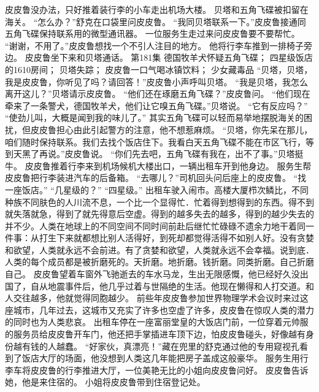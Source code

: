\documentclass[a4paper,12pt,UTF8,twoside]{ctexbook}
\begin{document}
        皮皮鲁没办法，只好推着装行李的小车走出机场大楼。 
        贝塔和五角飞碟被扣留在海关。 
        “怎么办？”舒克在口袋里问皮皮鲁。 
        “我同贝塔联系一下。”皮皮鲁接通同五角飞碟保持联系用的微型通讯器。 
        一位服务生走过来问皮皮鲁要不要帮忙。 
        “谢谢，不用了。”皮皮鲁想找一个不引人注目的地方。 
        他将行李车推到一排椅子旁边。 
        皮皮鲁坐下来和贝塔通话。   第181集 
        德国牧羊犬怀疑五角飞碟； 
        四星级饭店的1610房间； 
        贝塔失踪； 
        皮皮鲁一口气喝冰镇饮料； 
        少女藏毒品   
        “贝塔，贝塔，我是皮皮鲁，你听见了吗？请回答！”皮皮鲁小声呼叫贝塔。 
        “我是贝塔，我怎么离开这儿？”贝塔请示皮皮鲁。 
        “他们还在琢磨五角飞碟？”皮皮鲁问。 
        “他们现在牵来了一条警犬，德国牧羊犬，他们让它嗅五角飞碟。”贝塔说。 
        “它有反应吗？” 
        “使劲儿叫，大概是闻到我的味儿了。” 
        其实五角飞碟可以轻而易举地摆脱海关的困扰，但皮皮鲁担心由此引起警方的注意，他不想惹麻烦。 
        “贝塔，你先呆在那儿，咱们随时保持联系。我们去找个饭店住下。我看白天五角飞碟不能在市区飞行，等到天黑了再说。”皮皮鲁说。 
        “你们先去吧，五角飞碟有我在，出不了事。”贝塔挺牛。 
        皮皮鲁推着行李来到机场候机大楼出口，一辆出租车开到他身边。 
        服务生帮皮皮鲁把行李装进汽车的后备箱。 
        “去哪儿？”司机回头问后座上的皮皮鲁。 
        “找一座饭店。” 
        “几星级的？” 
        “四星级。” 
        出租车驶入闹市。高楼大厦栉次鳞比，不同种族不同肤色的人川流不息，一个比一个显得忙．忙着得到想得到的东西。得不到就失落就急，得到了就先得意后空虚。得到的越多失去的越多，得到的越少失去的并不少。人类在地球上的不同空间不同时间前赴后继忙忙碌碌不遗余力地干着同一件事：从打生下来就都想比别人活得好，到死却都觉得活得不如别人好。没有贪婪和欲望，人类就永远不会前进。有了贪婪和欲望，人类就永远不会幸福。说到底．人类的每个成员都是被折磨死的。天折磨。地折磨。钱折磨。同类折磨。自己折磨自己。 
        皮皮鲁望着车窗外飞驰逝去的车水马龙，生出无限感慨，他已经好久没出国了，自从地震事件后，他几乎过着与世隔绝的生活。他现在懒得和人打交道。和人交往越多，他就觉得同胞越少。 
        前些年皮皮鲁参加世界物理学术会议时来过这座城市，几年过去，这城市又充实了许多也空虚了许多，皮皮鲁在惊叹人类的潜力的同时也为人类悲哀。 
        出租车停在一座富丽堂皇的大饭店门前，一位穿着元帅服的服务员给皮皮鲁开车门，他还把手掌插进车顶下边，怕皮皮鲁碰头，好像越有身份越有钱的人越蠢。 
        “好家伙，真漂亮！”藏在兜里的舒克通过他的专用窥视孔看到了饭店大厅的场面，他没想到人类这几年能把房子盖成这般豪华。 
        服务生用行李车将皮皮鲁的行李推进大厅，一位美艳无比的小姐向皮皮鲁问好。 
        皮皮鲁告诉她，他是来住宿的。 
        小姐将皮皮鲁带到住宿登记处。 
\end{document}
